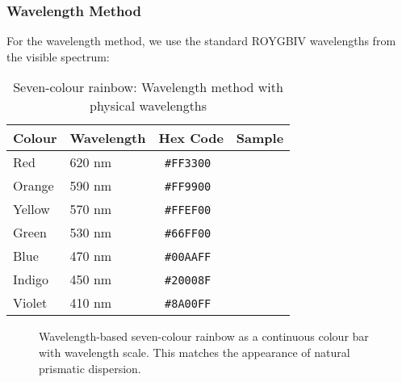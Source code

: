 \documentclass[12pt,a4paper]{article}
\newcommand{\hexcolour}[1]{%
  \definecolor{tempcolour}{HTML}{#1}%
  \texttt{\##1}~\raisebox{0.2ex}{\fboxsep=0pt\fbox{\colorbox{tempcolour}{\phantom{XX}}}}%
}
\begin{document}
\subsubsection{Wavelength Method}

For the wavelength method, we use the standard ROYGBIV wavelengths from the visible spectrum:

\begin{table}[ht]
\centering
\caption{Seven-colour rainbow: Wavelength method with physical wavelengths}
\label{tab:wave-rainbow}
\begin{tabular}{llcc}
\toprule
\textbf{Colour} & \textbf{Wavelength} & \textbf{Hex Code} & \textbf{Sample} \\
\midrule
Red & 620 nm & \hexcolour{FF3300} & \cellcolor{red620}\phantom{XXX} \\
Orange & 590 nm & \hexcolour{FF9900} & \cellcolor{orange590}\phantom{XXX} \\
Yellow & 570 nm & \hexcolour{FFEF00} & \cellcolor{yellow570}\phantom{XXX} \\
Green & 530 nm & \hexcolour{66FF00} & \cellcolor{green530}\phantom{XXX} \\
Blue & 470 nm & \hexcolour{00AAFF} & \cellcolor{blue470}\phantom{XXX} \\
Indigo & 450 nm & \hexcolour{20008F} & \cellcolor{indigo450}\phantom{XXX} \\
Violet & 410 nm & \hexcolour{8A00FF} & \cellcolor{violet410}\phantom{XXX} \\
\bottomrule
\end{tabular}
\end{table}

\begin{figure}[H]
\centering
{}
\caption{Wavelength-based seven-colour rainbow as a continuous colour bar with wavelength scale. This matches the appearance of natural prismatic dispersion.}
\label{fig:wave-rainbow-bar}
\end{figure}
\end{document}
